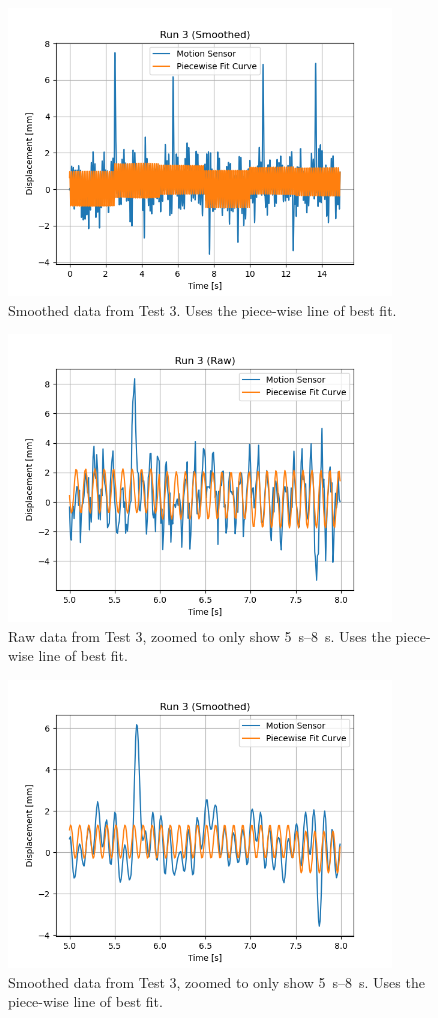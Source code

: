 \documentclass[12 pt]{report}
\begin{document}
\begin{figure}[htbp]
\centering
\includegraphics[width=4in]{images/Graphs/Run_3-Smoothed-PW}
\caption{Smoothed data from Test \num{3}. Uses the piece-wise line of best fit.}
\end{figure}

\begin{figure}[htbp]
\centering
\includegraphics[width=4in]{images/Graphs/Run_3-Raw-PW-Zoomed}
\caption{Raw data from Test \num{3}, zoomed to only show \qtyrange{5}{8}{\s}. Uses the piece-wise line of best fit.}
\end{figure}

\begin{figure}[htbp]
\centering
\includegraphics[width=4in]{images/Graphs/Run_3-Smoothed-PW-Zoomed}
\caption{Smoothed data from Test \num{3}, zoomed to only show \qtyrange{5}{8}{\s}. Uses the piece-wise line of best fit.}
\end{figure}
\end{document}
